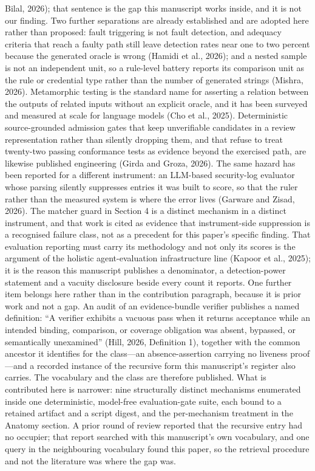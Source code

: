 \documentclass[11pt]{article}
\begin{document}
Bilal, 2026); that sentence is the gap this manuscript works inside, and it is not our finding. Two further separations are already established and are adopted here rather than proposed: fault triggering is not fault detection, and adequacy criteria that reach a faulty path still leave detection rates near one to two percent because the generated oracle is wrong (Hamidi et al., 2026); and a nested sample is not an independent unit, so a rule-level battery reports its comparison unit as the rule or credential type rather than the number of generated strings (Mishra, 2026). Metamorphic testing is the standard name for asserting a relation between the outputs of related inputs without an explicit oracle, and it has been surveyed and measured at scale for language models (Cho et al., 2025). Deterministic source-grounded admission gates that keep unverifiable candidates in a review representation rather than silently dropping them, and that refuse to treat twenty-two passing conformance tests as evidence beyond the exercised path, are likewise published engineering (Girda and Groza, 2026). The same hazard has been reported for a different instrument: an LLM-based security-log evaluator whose parsing silently suppresses entries it was built to score, so that the ruler rather than the measured system is where the error lives (Garware and Zisad, 2026). The matcher guard in Section 4 is a distinct mechanism in a distinct instrument, and that work is cited as evidence that instrument-side suppression is a recognised failure class, not as a precedent for this paper's specific finding. That evaluation reporting must carry its methodology and not only its scores is the argument of the holistic agent-evaluation infrastructure line (Kapoor et al., 2025); it is the reason this manuscript publishes a denominator, a detection-power statement and a vacuity disclosure beside every count it reports. One further item belongs here rather than in the contribution paragraph, because it is prior work and not a gap. An audit of an evidence-bundle verifier publishes a named definition: ``A verifier exhibits a vacuous pass when it returns acceptance while an intended binding, comparison, or coverage obligation was absent, bypassed, or semantically unexamined'' (Hill, 2026, Definition 1), together with the common ancestor it identifies for the class---an absence-assertion carrying no liveness proof---and a recorded instance of the recursive form this manuscript's register also carries. The vocabulary and the class are therefore published. What is contributed here is narrower: nine structurally distinct mechanisms enumerated inside one deterministic, model-free evaluation-gate suite, each bound to a retained artifact and a script digest, and the per-mechanism treatment in the Anatomy section. A prior round of review reported that the recursive entry had no occupier; that report searched with this manuscript's own vocabulary, and one query in the neighbouring vocabulary found this paper, so the retrieval procedure and not the literature was where the gap was.
\end{document}
